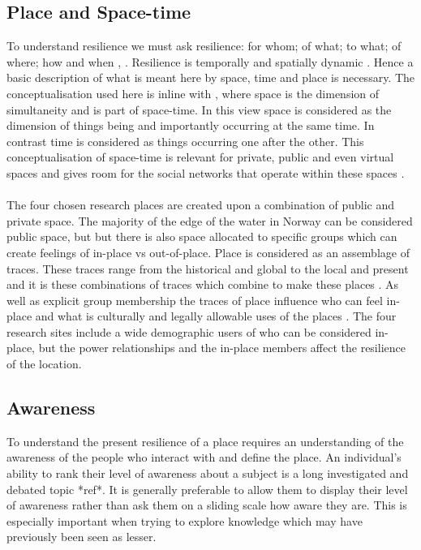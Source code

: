\subsection{Place and Space-time} 
To understand resilience we must ask resilience: for whom; of what; to what; of where; how and when \cite{cutter_community_2020}, \cite{moser_turbulent_2019}. Resilience is temporally and spatially dynamic \cite{cutter_community_2020}. Hence a basic description of what is meant here by space, time and place is necessary. The conceptualisation used here is inline with \cite{massey_for_2005}, where space is the dimension of simultaneity and is part of space-time. In this view space is considered as the dimension of things being and importantly occurring at the same time. In contrast time is considered as things occurring one after the other. This conceptualisation of space-time is relevant for private, public and even virtual spaces and gives room for the social networks that operate within these spaces \cite{massey_for_2005} \cite{allen_rethinking_1998}.

\paragraph{}
The four chosen research places are created upon a combination of public and private space. The majority of the edge of the water in Norway can be considered public space, but but there is also space allocated to specific groups which can create feelings of in-place vs out-of-place. Place is considered as an assemblage of traces. These traces range from the historical and global to the local and present and it is these combinations of traces which combine to make these places \cite{anderson_understanding_2015} \cite{massey_for_2005}. As well as explicit group membership the traces of place influence who can feel in-place and what is culturally and legally allowable uses of the places \cite{anderson_understanding_2015}. The four research sites include a wide demographic users of who can be considered in-place, but the power relationships and the in-place members affect the resilience of the location. 

\subsection{Awareness}
To understand the present resilience of a place requires an understanding of the awareness of the people who interact with and define the place. An individual’s ability to rank their level of awareness about a subject is a long investigated and debated topic *ref*. It is generally preferable to allow them to display their level of awareness rather than ask them on a sliding scale how aware they are. This is especially important when trying to explore knowledge which may have previously been seen as lesser.

